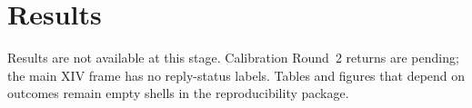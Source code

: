\section{Results}
\label{sec:results}


Results are not available at this stage. Calibration Round~2 returns are
pending; the main XIV frame has no reply-status labels. Tables and figures that
depend on outcomes remain empty shells in the reproducibility package.
